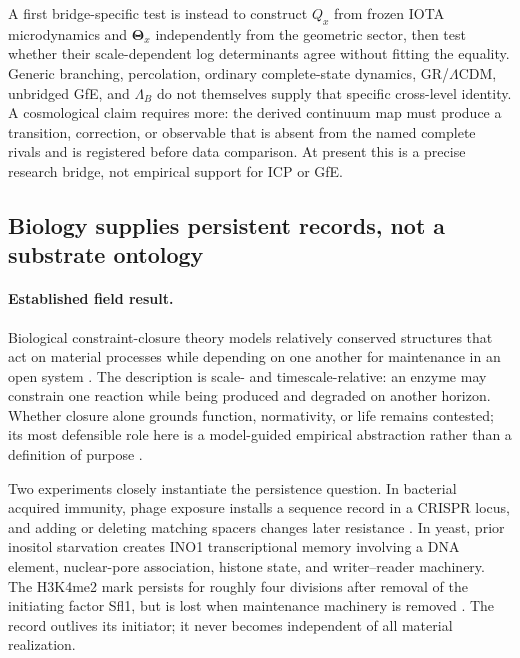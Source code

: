 A first bridge-specific test is instead to construct $Q_x$ from frozen IOTA
microdynamics and $\boldsymbol\Theta_x$ independently from the geometric sector,
then test whether their scale-dependent log determinants agree without fitting
the equality. Generic branching, percolation, ordinary complete-state dynamics,
GR/\(\Lambda\)CDM, unbridged GfE, and $\Lambda_B$ do not themselves supply that
specific cross-level identity. A cosmological claim requires more: the derived
continuum map must
produce a transition, correction, or observable that is absent from the named
complete rivals and is registered before data comparison. At present this is a
precise research bridge, not empirical support for ICP or GfE.

\subsection{Biology supplies persistent records, not a substrate ontology}

\paragraph{Established field result.}
Biological constraint-closure theory models relatively conserved structures
that act on material processes while depending on one another for maintenance
in an open system \citep{MontevilMossio2015Closure}.  The description is
scale- and timescale-relative: an enzyme may constrain one reaction while being
produced and degraded on another horizon.  Whether closure alone grounds
function, normativity, or life remains contested; its most defensible role here
is a model-guided empirical abstraction rather than a definition of purpose
\citep{Garson2017AgainstOrganizational,Corti2023OrganizationalNormativity,
Rider2025ClosureModel}.

Two experiments closely instantiate the persistence question.  In bacterial
acquired immunity, phage exposure installs a sequence record in a CRISPR locus,
and adding or deleting matching spacers changes later resistance
\citep{BarrangouEtAl2007CRISPR}.  In yeast, prior inositol starvation creates
INO1 transcriptional memory involving a DNA element, nuclear-pore association,
histone state, and writer--reader machinery.  The H3K4me2 mark persists for
roughly four divisions after removal of the initiating factor Sfl1, but is lost
when maintenance machinery is removed
\citep{LightEtAl2010INO1,SumpEtAl2022INO1Memory}.  The record outlives its initiator;
it never becomes independent of all material realization.


